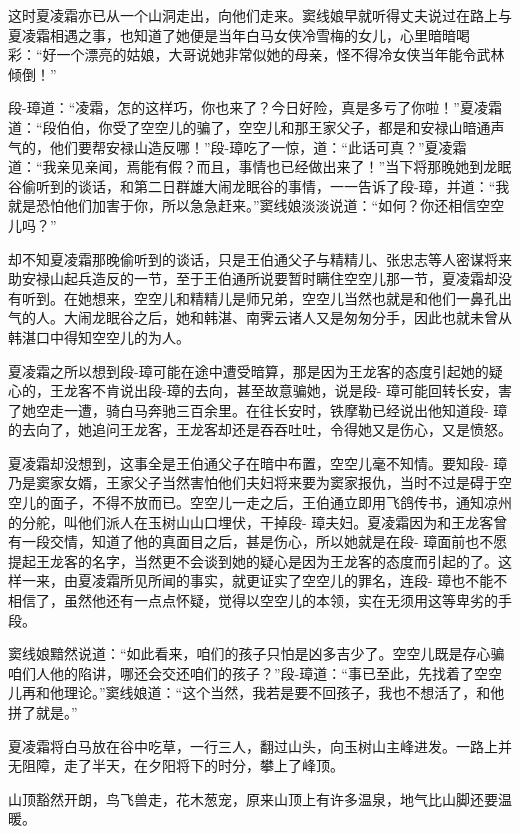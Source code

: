 \documentclass[12pt,oneside]{book}
\begin{document}
这时夏凌霜亦已从一个山洞走出，向他们走来。窦线娘早就听得丈夫说过在路上与夏凌霜相遇之事，也知道了她便是当年白马女侠冷雪梅的女儿，心里暗暗喝彩：``好一个漂亮的姑娘，大哥说她非常似她的母亲，怪不得冷女侠当年能令武林倾倒！''

段-璋道：``凌霜，怎的这样巧，你也来了？今日好险，真是多亏了你啦！''夏凌霜道：``段伯伯，你受了空空儿的骗了，空空儿和那王家父子，都是和安禄山暗通声气的，他们要帮安禄山造反哪！''段-璋吃了一惊，道：``此话可真？''夏凌霜道：``我亲见亲闻，焉能有假？而且，事情也已经做出来了！''当下将那晚她到龙眠谷偷听到的谈话，和第二日群雄大闹龙眠谷的事情，一一告诉了段-璋，并道：``我就是恐怕他们加害于你，所以急急赶来。''窦线娘淡淡说道：``如何？你还相信空空儿吗？''

却不知夏凌霜那晚偷听到的谈话，只是王伯通父子与精精儿、张忠志等人密谋将来助安禄山起兵造反的一节，至于王伯通所说要暂时瞒住空空儿那一节，夏凌霜却没有听到。在她想来，空空儿和精精儿是师兄弟，空空儿当然也就是和他们一鼻孔出气的人。大闹龙眠谷之后，她和韩湛、南霁云诸人又是匆匆分手，因此也就未曾从韩湛口中得知空空儿的为人。

夏凌霜之所以想到段-璋可能在途中遭受暗算，那是因为王龙客的态度引起她的疑心的，王龙客不肯说出段-璋的去向，甚至故意骗她，说是段-
璋可能回转长安，害了她空走一遭，骑白马奔驰三百余里。在往长安时，铁摩勒已经说出他知道段-
璋的去向了，她追问王龙客，王龙客却还是吞吞吐吐，令得她又是伤心，又是愤怒。

夏凌霜却没想到，这事全是王伯通父子在暗中布置，空空儿毫不知情。要知段-
璋乃是窦家女婿，王家父子当然害怕他们夫妇将来要为窦家报仇，当时不过是碍于空空儿的面子，不得不放而已。空空儿一走之后，王伯通立即用飞鸽传书，通知凉州的分舵，叫他们派人在玉树山山口埋伏，干掉段-
璋夫妇。夏凌霜因为和王龙客曾有一段交情，知道了他的真面目之后，甚是伤心，所以她就是在段-
璋面前也不愿提起王龙客的名字，当然更不会谈到她的疑心是因为王龙客的态度而引起的了。这样一来，由夏凌霜所见所闻的事实，就更证实了空空儿的罪名，连段-
璋也不能不相信了，虽然他还有一点点怀疑，觉得以空空儿的本领，实在无须用这等卑劣的手段。

窦线娘黯然说道：``如此看来，咱们的孩子只怕是凶多吉少了。空空儿既是存心骗咱们人他的陷讲，哪还会交还咱们的孩子？''段-璋道：``事已至此，先找着了空空儿再和他理论。''窦线娘道：``这个当然，我若是要不回孩子，我也不想活了，和他拼了就是。''

夏凌霜将白马放在谷中吃草，一行三人，翻过山头，向玉树山主峰进发。一路上并无阻障，走了半天，在夕阳将下的时分，攀上了峰顶。

山顶豁然开朗，鸟飞兽走，花木葱宠，原来山顶上有许多温泉，地气比山脚还要温暖。
\end{document}
